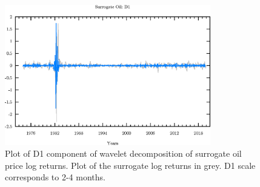 \begin{figure}
\begin{center}
\includegraphics[width=0.8\textwidth]{./code/plot/surrogate_oil_wr_D1.eps}
\caption{Plot of D1 component of wavelet decomposition of surrogate oil price log returns. 
	Plot of the surrogate log returns in grey. D1 scale corresponds to 2-4 months.}
\end{center}
\label{fig:s-oil-wr-d1}
\end{figure}
